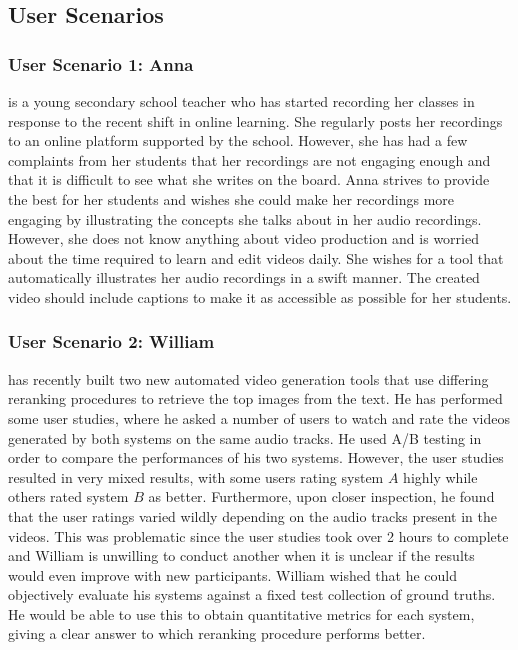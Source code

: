 \documentclass{l4proj}
\begin{document}
\subsection{User Scenarios}
\subsubsection{User Scenario 1: Anna} is a young secondary school teacher who has started recording her classes in response to the recent shift in online learning. She regularly posts her recordings to an online platform supported by the school. However, she has had a few complaints from her students that her recordings are not engaging enough and that it is difficult to see what she writes on the board. Anna strives to provide the best for her students and wishes she could make her recordings more engaging by illustrating the concepts she talks about in her audio recordings. However, she does not know anything about video production and is worried about the time required to learn and edit videos daily. She wishes for a tool that automatically illustrates her audio recordings in a swift manner. The created video should include captions to make it as accessible as possible for her students.

\subsubsection{User Scenario 2: William} has recently built two new automated video generation tools that use differing reranking procedures to retrieve the top images from the text. He has performed some user studies, where he asked a number of users to watch and rate the videos generated by both systems on the same audio tracks. He used A/B testing in order to compare the performances of his two systems. However, the user studies resulted in very mixed results, with some users rating system $A$ highly while others rated system $B$ as better. Furthermore, upon closer inspection, he found that the user ratings varied wildly depending on the audio tracks present in the videos. This was problematic since the user studies took over 2 hours to complete and William is unwilling to conduct another when it is unclear if the results would even improve with new participants. William wished that he could objectively evaluate his systems against a fixed test collection of ground truths. He would be able to use this to obtain quantitative metrics for each system, giving a clear answer to which reranking procedure performs better.
\end{document}

